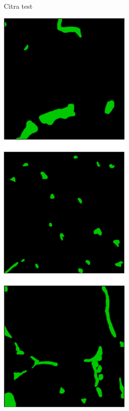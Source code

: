 \begin{figure}[H]
\begin{subfigure}[b]{0.24\textwidth}
		\caption{Citra test}
		\label{fig:image_hasil}
	\end{subfigure}
	\hfill
	\begin{subfigure}[b]{0.24\textwidth}
		\centering
		\includegraphics[width=\textwidth]{gambar/bab4/true_label.png}

\end{subfigure}
\end{figure}
